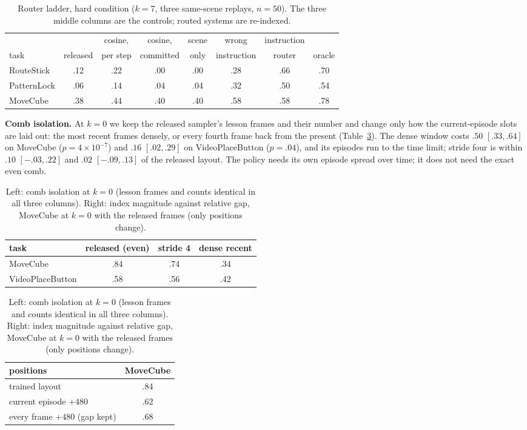 \begin{table}[h]
\centering\small
\caption{Router ladder, hard condition ($k{=}7$, three same-scene replays, $n{=}50$). The three middle columns are the controls; routed systems are re-indexed.}
\label{tab:ladder}
\setlength{\tabcolsep}{5pt}
\begin{tabular}{lccccccc}
\toprule
 & & cosine, & cosine, & scene & wrong & instruction & \\
task & released & per step & committed & only & instruction & router & oracle\\
\midrule
RouteStick & .12 & .22 & .00 & .00 & .28 & .66 & .70\\
PatternLock & .06 & .14 & .04 & .04 & .32 & .50 & .54\\
MoveCube & .38 & .44 & .40 & .40 & .58 & .58 & .78\\
\bottomrule
\end{tabular}
\end{table}

\textbf{Comb isolation.} At $k{=}0$ we keep the released sampler's lesson frames and their number and change only how the current-episode slots are laid out: the most recent frames densely, or every fourth frame back from the present (Table~\ref{tab:comb}). The dense window costs $.50$ $[.33,.64]$ on MoveCube ($p=4\times10^{-7}$) and $.16$ $[.02,.29]$ on VideoPlaceButton ($p=.04$), and its episodes run to the time limit; stride four is within $.10$ $[-.03,.22]$ and $.02$ $[-.09,.13]$ of the released layout. The policy needs its own episode spread over time; it does not need the exact even comb.

\begin{table}[h]
\centering\small
\caption{Left: comb isolation at $k{=}0$ (lesson frames and counts identical in all three columns). Right: index magnitude against relative gap, MoveCube at $k{=}0$ with the released frames (only positions change).}
\label{tab:comb}
\setlength{\tabcolsep}{5pt}
\begin{tabular}{lccc}
\toprule
task & released (even) & stride 4 & dense recent\\
\midrule
MoveCube & .84 & .74 & .34\\
VideoPlaceButton & .58 & .56 & .42\\
\bottomrule
\end{tabular}\qquad
\begin{tabular}{lc}
\toprule
positions & MoveCube\\
\midrule
trained layout & .84\\
current episode $+480$ & .62\\
every frame $+480$ (gap kept) & .68\\
\bottomrule
\end{tabular}
\end{table}


